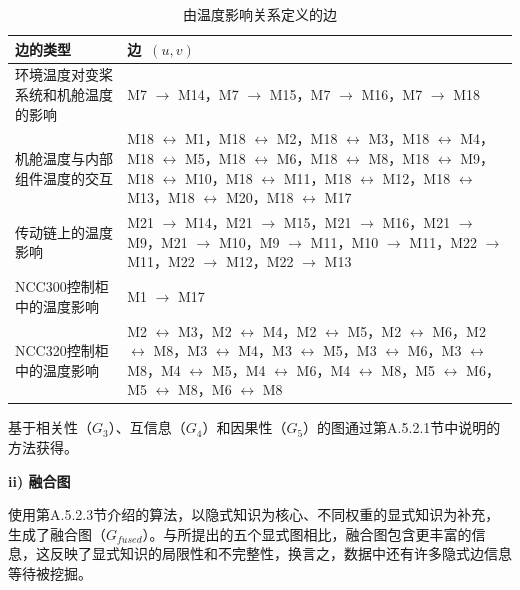 \begin{table}[htbp]
\centering
\caption{由温度影响关系定义的边}
\label{tab:appA-temperature}
\small
\begin{tabular}{lp{9cm}}
\toprule
边的类型 & 边~$(u, v)$ \\
\midrule
环境温度对变桨系统和机舱温度的影响 & M7 $\rightarrow$ M14，M7 $\rightarrow$ M15，M7 $\rightarrow$ M16，M7 $\rightarrow$ M18 \\
\addlinespace
机舱温度与内部组件温度的交互 & M18 $\leftrightarrow$ M1，M18 $\leftrightarrow$ M2，M18 $\leftrightarrow$ M3，M18 $\leftrightarrow$ M4，M18 $\leftrightarrow$ M5，M18 $\leftrightarrow$ M6，M18 $\leftrightarrow$ M8，M18 $\leftrightarrow$ M9，M18 $\leftrightarrow$ M10，M18 $\leftrightarrow$ M11，M18 $\leftrightarrow$ M12，M18 $\leftrightarrow$ M13，M18 $\leftrightarrow$ M20，M18 $\leftrightarrow$ M17 \\
\addlinespace
传动链上的温度影响 & M21 $\rightarrow$ M14，M21 $\rightarrow$ M15，M21 $\rightarrow$ M16，M21 $\rightarrow$ M9，M21 $\rightarrow$ M10，M9 $\rightarrow$ M11，M10 $\rightarrow$ M11，M22 $\rightarrow$ M11，M22 $\rightarrow$ M12，M22 $\rightarrow$ M13 \\
\addlinespace
NCC300控制柜中的温度影响 & M1 $\rightarrow$ M17 \\
\addlinespace
NCC320控制柜中的温度影响 & M2 $\leftrightarrow$ M3，M2 $\leftrightarrow$ M4，M2 $\leftrightarrow$ M5，M2 $\leftrightarrow$ M6，M2 $\leftrightarrow$ M8，M3 $\leftrightarrow$ M4，M3 $\leftrightarrow$ M5，M3 $\leftrightarrow$ M6，M3 $\leftrightarrow$ M8，M4 $\leftrightarrow$ M5，M4 $\leftrightarrow$ M6，M4 $\leftrightarrow$ M8，M5 $\leftrightarrow$ M6，M5 $\leftrightarrow$ M8，M6 $\leftrightarrow$ M8 \\
\bottomrule
\end{tabular}
\end{table}

基于相关性（$G_3$）、互信息（$G_4$）和因果性（$G_5$）的图通过第A.5.2.1节中说明的方法获得。


\textbf{ii) 融合图}

使用第A.5.2.3节介绍的算法，以隐式知识为核心、不同权重的显式知识为补充，生成了融合图（$G_{fused}$）。与所提出的五个显式图相比，融合图包含更丰富的信息，这反映了显式知识的局限性和不完整性，换言之，数据中还有许多隐式边信息等待被挖掘。

